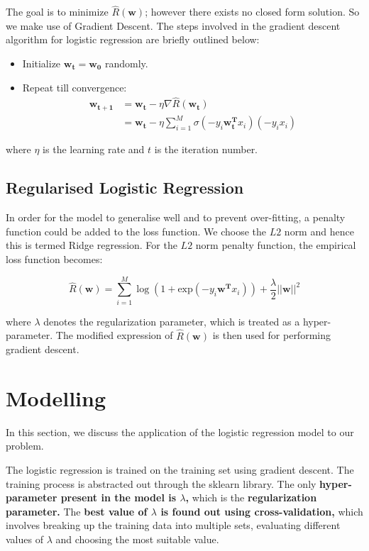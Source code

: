 \documentclass[conference]{IEEEtran}
\begin{document}
The goal is to minimize $\hat{R}(\mathbf{w})$; however there exists no closed form solution. So we make use of Gradient Descent. The steps involved in the gradient descent algorithm for logistic regression are briefly outlined below:

\begin{itemize}
    \item Initialize $\mathbf{w_t} = \mathbf{w_0}$ randomly.
    \item Repeat till convergence:
    \begin{align*}
        \mathbf{w_{t+1}} &= \mathbf{w_t} - \eta \nabla{ \hat{R}(\mathbf{w_t})} \\
        &= \mathbf{w_t} - \eta \sum_{i = 1}^{M}\sigma({-y_i\mathbf{w_t^T}x_i})(-y_ix_i)
    \end{align*}
\end{itemize}

where $\eta$ is the learning rate and $t$ is the iteration number.

\subsection*{Regularised Logistic Regression}

In order for the model to generalise well and to prevent over-fitting, a penalty function could be added to the loss function. We choose the $L2$ norm and hence this is termed Ridge regression. For the $L2$ norm penalty function, the empirical loss function becomes:

$$ \hat{R}(\mathbf{w}) = \sum_{i=1}^{M}\log{(1 + \textrm{exp}(-y_i\mathbf{w^T}x_i))} + \frac{\lambda}{2}||\mathbf{w}||^2 $$

where $\lambda$ denotes the regularization parameter, which is treated as a hyper-parameter. The modified expression of $\hat{R}(\mathbf{w})$ is then used for performing gradient descent.

\section{Modelling }

In this section, we discuss the application of the logistic regression model to our problem. 

The logistic regression is trained on the training set using gradient descent. The training process is abstracted out through the sklearn library. The only \textbf{hyper-parameter present in the model is $\lambda$,} which is the \textbf{regularization parameter.} The \textbf{best value of $\lambda$ is found out using cross-validation,} which involves breaking up the training data into multiple sets, evaluating different values of $\lambda$ and choosing the most suitable value.
\end{document}
